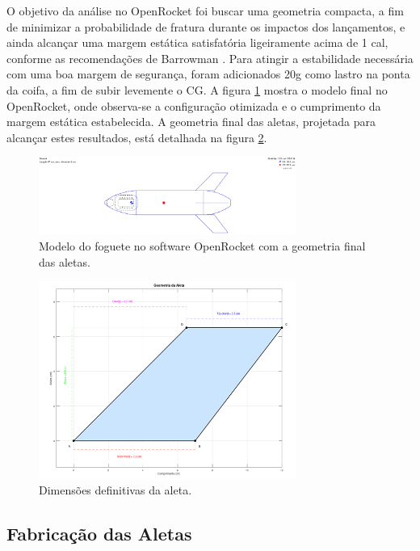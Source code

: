 O objetivo da análise no OpenRocket foi buscar uma geometria compacta, a fim de minimizar a probabilidade de fratura durante os impactos dos lançamentos, e ainda alcançar uma margem estática satisfatória ligeiramente acima de 1 cal, conforme as recomendações de Barrowman \cite{barrowman1966}. Para atingir a estabilidade necessária com uma boa margem de segurança, foram adicionados 20g como lastro na ponta da coifa, a fim de subir levemente o CG. A figura \ref{fig_foguete_software} mostra o modelo final no OpenRocket, onde observa-se a configuração otimizada e o cumprimento da margem estática estabelecida. A geometria final das aletas, projetada para alcançar estes resultados, está detalhada na figura \ref{fig_atleta}.

\begin{figure}[H]
	\centering
	\includegraphics[width=0.75\textwidth,height=\textheight,keepaspectratio]{figuras/estruturas/foguete_software.png}
	\caption{Modelo do foguete no software OpenRocket com a geometria final das aletas.}
	\label{fig_foguete_software}
\end{figure}

\begin{figure}[H]
	\centering
	\includegraphics[width=0.75\textwidth,height=\textheight,keepaspectratio]{figuras/estruturas/atleta.png}
	\caption{Dimensões definitivas da aleta.}
	\label{fig_atleta}
\end{figure}

\subsection{Fabricação das Aletas}

